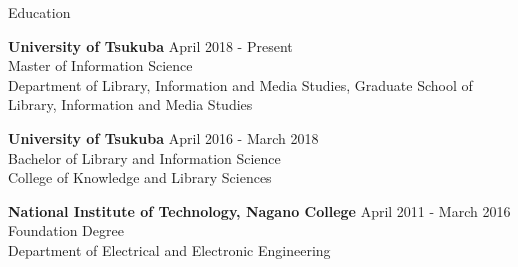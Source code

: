 \documentclass{resume} %
\begin{document}

\begin{rSection}{Education}

    {\bf University of Tsukuba} \hfill {April 2018 - Present}
    \\ Master of Information Science
    \\ Department of Library, Information and Media Studies, Graduate School of Library, Information and Media Studies

    {\bf University of Tsukuba} \hfill {April 2016 - March 2018}
    \\ Bachelor of Library and Information Science
    \\ College of Knowledge and Library Sciences

    {\bf National Institute of Technology, Nagano College} \hfill {April 2011 - March 2016}
    \\ Foundation Degree
    \\ Department of Electrical and Electronic Engineering



\end{rSection}

\end{document}

